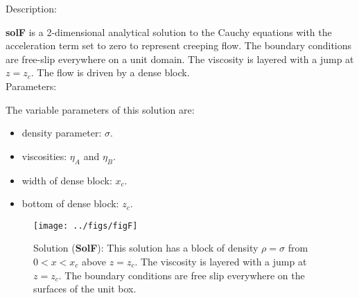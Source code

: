   {\large \fontB Description:}
  
  {\bf solF} is a 2-dimensional analytical solution to the Cauchy equations with the acceleration term set to zero
  to represent creeping flow. The boundary conditions are free-slip everywhere on a unit domain. The viscosity is layered with a jump at $ z=z_c $.
  The flow is driven by a dense block.
  \\

  {\large \fontB Parameters:}
 
 The variable parameters of this solution are:
 \begin{itemize}
   \item{density parameter: $ \sigma $.}
   \item{viscosities: $\eta_A$ and $\eta_B$.}
   \item{width of dense block: $x_c$.}
   \item{bottom of dense block: $z_c$.}
 \end{itemize}

  \begin{SCfigure}[][h]
    \texttt{[image: ../figs/figF]}
    \caption[Short caption]{\label{figF} 
      Solution ({\bf SolF}):
      This solution has a block of density $\rho = \sigma$ from $0 < x < x_c$ above
      $ z= z_c$.
      The viscosity is layered with a jump at $ z=z_c $.
      The boundary conditions are free slip everywhere on the surfaces of the unit box.}
  \end{SCfigure} 
  

